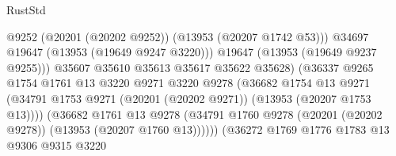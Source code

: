 \begin{lexlean}{RustStd}
\begin{coremodule}
                                                @9252
                                                (@20201 (@20202 @9252))
                                                (@13953 (@20207 @1742 @53)))
                                              @34697
                                              @19647
                                              (@13953 (@19649 @9247 @3220)))
                                            @19647
                                            (@13953 (@19649 @9237 @9255)))
                                          @35607
                                          @35610
                                          @35613
                                          @35617
                                          @35622
                                          @35628)
                                        (@36337
                                          @9265
                                          @1754
                                          @1761
                                          @13
                                          @3220
                                          @9271
                                          @3220
                                          @9278
                                          (@36682
                                            @1754
                                            @13
                                            @9271
                                            (@34791
                                              @1753
                                              @9271
                                              (@20201 (@20202 @9271))
                                              (@13953 (@20207 @1753 @13))))
                                          (@36682
                                            @1761
                                            @13
                                            @9278
                                            (@34791
                                              @1760
                                              @9278
                                              (@20201 (@20202 @9278))
                                              (@13953 (@20207 @1760 @13))))))
                                      (@36272
                                        @1769
                                        @1776
                                        @1783
                                        @13
                                        @9306
                                        @9315
                                        @3220

\end{coremodule}
\end{lexlean}
